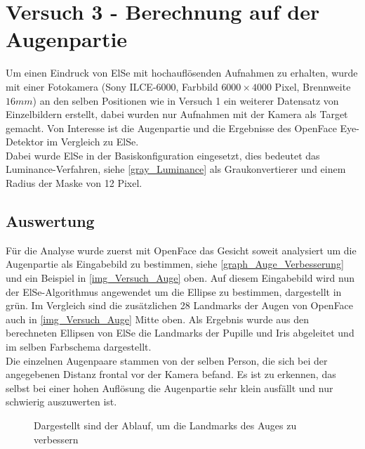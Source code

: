 \section{Versuch 3 - Berechnung auf der Augenpartie}
Um einen Eindruck von ElSe mit hochauflösenden Aufnahmen zu erhalten, wurde mit einer Fotokamera (Sony ILCE-6000, Farbbild $6000\times 4000$ Pixel, Brennweite $16mm$) an den selben Positionen wie in Versuch 1 ein weiterer Datensatz von Einzelbildern erstellt, dabei wurden nur Aufnahmen mit der Kamera als Target gemacht. Von Interesse ist die Augenpartie und die Ergebnisse des OpenFace Eye-Detektor im Vergleich zu ElSe.\\
Dabei wurde ElSe in der Basiskonfiguration eingesetzt, dies bedeutet das Luminance-Verfahren, siehe \autoref{gray_Luminance} als Graukonvertierer und einem Radius der Maske von 12 Pixel.
\subsection{Auswertung}
Für die Analyse wurde zuerst mit OpenFace das Gesicht soweit analysiert um die Augenpartie als Eingabebild zu bestimmen, siehe \autoref{graph_Auge_Verbesserung} und ein Beispiel in \autoref{img_Versuch_Auge} oben. Auf diesem Eingabebild wird nun der ElSe-Algorithmus angewendet um die Ellipse zu bestimmen, dargestellt in grün. Im Vergleich sind die zusätzlichen 28 Landmarks der Augen von OpenFace auch in \autoref{img_Versuch_Auge} Mitte oben. Als Ergebnis wurde aus den berechneten Ellipsen von ElSe die Landmarks der Pupille und Iris abgeleitet und im selben Farbschema dargestellt.\\
Die einzelnen Augenpaare stammen von der selben Person, die sich bei der angegebenen Distanz frontal vor der Kamera befand. Es ist zu erkennen, das selbst bei einer hohen Auflösung die Augenpartie sehr klein ausfällt und nur schwierig auszuwerten ist.
\begin{figure}
	\centering
	
	\caption{Dargestellt sind der Ablauf, um die Landmarks des Auges zu verbessern}
	\label{graph_Auge_Verbesserung}
\end{figure}
